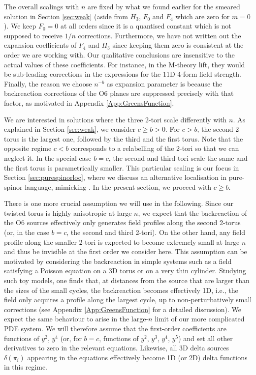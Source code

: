 \documentclass[11pt]{article}
\renewcommand{\[}{\left[}
\renewcommand{\]}{\right]}
\renewcommand{\(}{\left(}
\renewcommand{\)}{\right)}
\newcommand{\<}{\langle}
\renewcommand{\>}{\rangle}
\begin{document}
The overall scalings with $n$ are fixed by what we found earlier for the smeared solution in Section \ref{sec:weak} (aside from $H_3$, $F_0$ and $F_4$ which are zero for $m=0$). We keep $F_0=0$ at all orders since it is a quantised constant which is not supposed to receive $1/n$ corrections. Furthermore, we have not written out the expansion coefficients of $F_4$ and $H_3$ since keeping them zero is consistent at the order we are working with. Our qualitative conclusions are insensitive to the actual values of these coefficients. For instance, in the M-theory lift, they would be sub-leading corrections in the expressions for the 11D 4-form field strength. Finally, the reason we choose $n^{-b}$ as expansion parameter is because the backreaction corrections of the O6 planes are suppressed precisely with that factor, as motivated in Appendix \ref{App:GreensFunction}. 

We are interested in solutions where the three 2-tori scale differently with $n$. As explained in Section \ref{sec:weak}, we consider $c\ge b>0$. For $c>b$, the second 2-torus is the largest one, followed by the third and the first torus. Note that the opposite regime $c<b$ corresponds to a relabelling of the 2-tori so that we can neglect it. In the special case $b=c$, the second and third tori scale the same and the first torus is parametrically smaller.
This particular scaling is our focus in Section \ref{sec:purespinorloc}, where we discuss an alternative localisation in pure-spinor language, mimicking \cite{Marchesano:2020qvg}. In the present section, we proceed with $c\ge b$.

There is one more crucial assumption we will use in the following. Since our twisted torus is highly anisotropic at large $n$, we expect that the backreaction of the O6 sources effectively only generates field profiles along the second 2-torus (or, in the case $b=c$, the second and third 2-tori). On the other hand, any field profile along the smaller 2-tori is expected to become extremely small at large $n$ and thus be invisible at the first order we consider here. This assumption can be motivated by considering the backreaction in simple systems such as a field satisfying a Poisson equation on a 3D torus or on a very thin cylinder. Studying such toy models, one finds that, at distances from the source that are larger than the sizes of the small cycles, the backreaction becomes effectively 1D, i.e., the field only acquires a profile along the largest cycle, up to non-perturbatively small corrections (see Appendix \ref{App:GreensFunction} for a detailed discussion). We expect the same behaviour to arise in the large-$n$ limit of our more complicated PDE system. We will therefore assume that the first-order coefficients are functions of $y^2$, $y^4$ (or, for $b=c$, functions of $y^2$, $y^3$, $y^4$, $y^5$) and set all other derivatives to zero in the relevant equations. Likewise, all 3D delta sources $\delta(\pi_i)$ appearing in the equations effectively become 1D (or 2D) delta functions in this regime.
\end{document}
